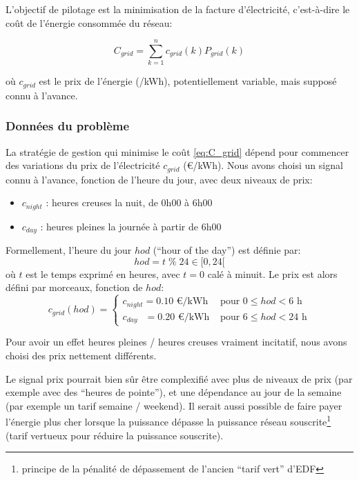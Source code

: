 \documentclass[a4paper,10pt,twocolumn]{article}
\begin{document}
L'objectif de pilotage est la minimisation de la facture d'électricité,
c'est-à-dire le coût de l'énergie consommée du réseau:

\begin{equation} \label{eq:C_grid}
  C_{grid} = \sum_{k=1}^{n} c_{grid}(k)P_{grid}(k)
\end{equation}

où $c_{grid}$ est le prix de l'énergie (\texteuro/kWh), potentiellement variable,
mais supposé connu à l'avance.

\subsubsection{Données du problème}
\label{sss:fixed_var}

La stratégie de gestion qui minimise le coût \eqref{eq:C_grid}
dépend pour commencer des variations du prix de l'électricité $c_{grid}$ (€/kWh).
Nous avons choisi un signal connu à l'avance, fonction de l'heure du jour,
avec deux niveaux de prix:
\begin{itemize}
 \item $c_{night}$ : heures creuses la nuit, de 0h00 à 6h00
 \item $c_{day}$ : heures pleines la journée à partir de 6h00
\end{itemize}

Formellement, l'heure du jour $hod$ (``hour of the day'') est définie par:
%
\begin{equation} \label{eq:hod}
  hod = t \; \% \; 24 \in [0, 24[
\end{equation} 
où $t$ est le temps exprimé en heures, avec $t=0$ calé à minuit.
Le prix est alors défini par morceaux, fonction de $hod$:
\begin{equation}
  c_{grid}(hod) = \begin{cases}
    c_{night} = 0.10 \text{ €/kWh} & \text{ pour } 0 \leq hod < 6\text{ h}\\
    c_{day} \;\;\,  = 0.20 \text{ €/kWh} & \text{ pour } 6 \leq hod < 24\text{ h}
  \end{cases}
\end{equation}

Pour avoir un effet heures pleines / heures creuses vraiment incitatif,
nous avons choisi des prix nettement différents.

Le signal prix pourrait bien sûr être complexifié avec plus de niveaux de prix
(par exemple avec des ``heures de pointe''), et une dépendance au jour de la semaine
(par exemple un tarif semaine / weekend).
Il serait aussi possible de faire payer l'énergie plus cher lorsque la puissance
dépasse la puissance réseau souscrite\footnote{
  principe de la pénalité de dépassement de l'ancien ``tarif vert'' d'EDF}
(tarif vertueux pour réduire la puissance souscrite).
\end{document}

